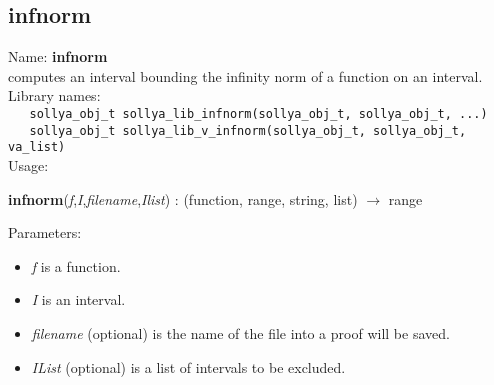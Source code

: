 \subsection{infnorm}
\label{labinfnorm}
\noindent Name: \textbf{infnorm}\\
\phantom{aaa}computes an interval bounding the infinity norm of a function on an interval.\\[0.2cm]
\noindent Library names:\\
\verb|   sollya_obj_t sollya_lib_infnorm(sollya_obj_t, sollya_obj_t, ...)|\\
\verb|   sollya_obj_t sollya_lib_v_infnorm(sollya_obj_t, sollya_obj_t, va_list)|\\[0.2cm]
\noindent Usage: 
\begin{center}
\textbf{infnorm}(\emph{f},\emph{I},\emph{filename},\emph{Ilist}) : (\textsf{function}, \textsf{range}, \textsf{string}, \textsf{list}) $\rightarrow$ \textsf{range}\\
\end{center}
Parameters: 
\begin{itemize}
\item \emph{f} is a function.
\item \emph{I} is an interval.
\item \emph{filename} (optional) is the name of the file into a proof will be saved.
\item \emph{IList} (optional) is a list of intervals to be excluded.
\end{itemize}
